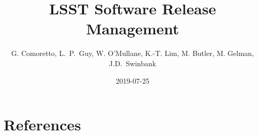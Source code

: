 \documentclass[DM,toc]{lsstdoc}
\title{LSST Software Release Management}
\author{%
G. Comoretto, L.~P.~Guy, W. O'Mullane, K.-T. Lim, M. Butler, M. Gelman, J.D.~Swinbank
}
\date{2019-07-25}
\begin{document}
\maketitle



\newpage


\newpage


\newpage


\newpage
\appendix

\section{References} \label{sec:bib}


\newpage
\printglossaries
\end{document}
